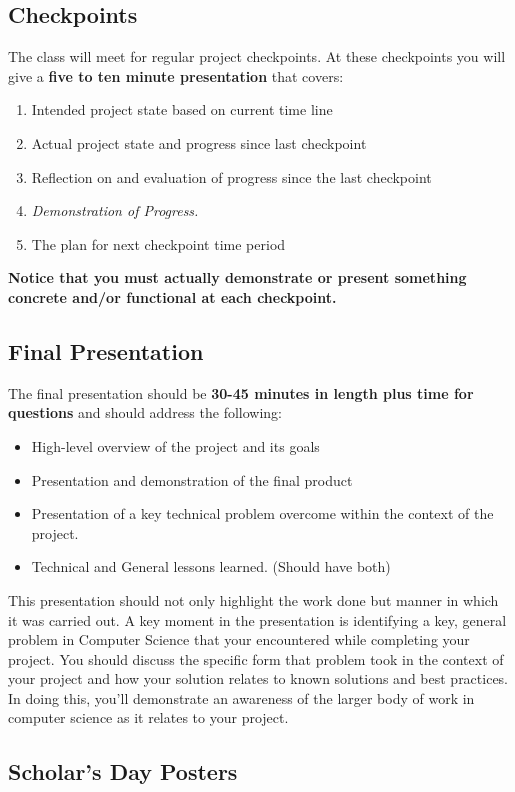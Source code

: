 \documentclass[10pt]{article}
\begin{document}
\subsection{Checkpoints}

The class will meet for regular project checkpoints. At these checkpoints you will give a \textbf{five to ten minute presentation} that covers:
\begin{enumerate}
\item Intended project state based on current time line
\item Actual project state and progress since last checkpoint
\item Reflection on and evaluation of progress since the last checkpoint
\item \textit{Demonstration of Progress.} 
\item The plan for next checkpoint time period
\end{enumerate}
\textbf{Notice that you must actually demonstrate or present something concrete and/or functional at each checkpoint.}


\subsection{Final Presentation}
 
The final presentation should be \textbf{30-45 minutes in length plus time for questions} and should address the following:
\begin{itemize}
\item High-level overview of the project and its goals
\item Presentation and demonstration of the final product
\item Presentation of a key technical problem overcome within the context of the project.
\item Technical and General lessons learned. (Should have both)
\end{itemize}
This presentation should not only highlight the work done but manner in which it was carried out.  A key moment in the presentation is identifying a key, general problem in Computer Science that your encountered while completing your project.  You should discuss the specific form that problem took in the context of your project and how your solution relates to known solutions and best practices. In doing this, you'll demonstrate an awareness of the larger body of work in computer science as it relates to your project.

\subsection{Scholar's Day Posters}
\end{document}
